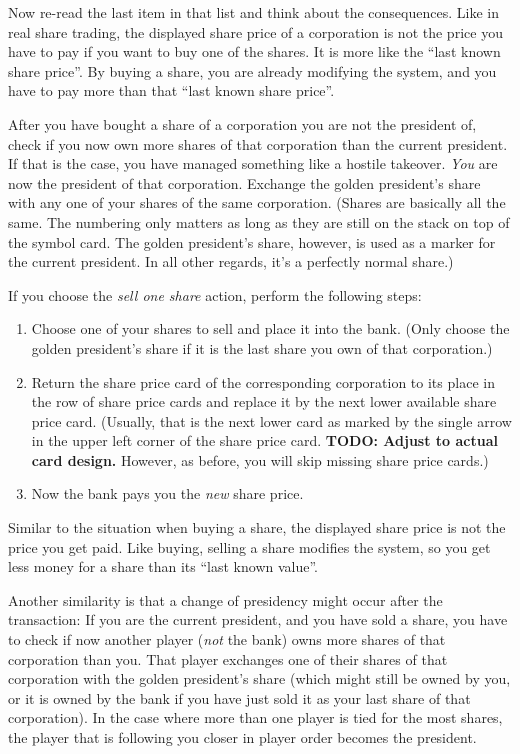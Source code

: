 \documentclass[10pt,final]{report}
\begin{document}
\begin{multicols}{2}
Now re-read the last item in that list and think about the
consequences. Like in real share trading, the displayed share price of
a corporation is not the price you have to pay if you want to buy one
of the shares. It is more like the ``last known share price''. By
buying a share, you are already modifying the system, and you have to
pay more than that ``last known share price''.

After you have bought a share of a corporation you are not the
president of, check if you now own more shares of that corporation
than the current president. If that is the case, you have managed
something like a hostile takeover. \emph{You} are now the president of
that corporation. Exchange the golden president's share with any one
of your shares of the same corporation. (Shares are basically
all the same. The numbering only matters as long as they are
still on the stack on top of the symbol card. The golden president's
share, however, is used as a marker for the current
president. In all other regards, it's a perfectly normal share.)

If you choose the \emph{sell one share} action, perform the following
steps:
\begin{enumerate}
\item Choose one of your shares to sell and place it into the
  bank. (Only choose the golden president's share if it is the last
  share you own of that corporation.)
\item Return the share price card of the corresponding corporation to
  its place in the row of share price cards and replace it by the next
  lower available share price card. (Usually, that is the next lower
  card as marked by the single arrow in the upper left corner of the
  share price card. \textbf{TODO: Adjust to actual card design.}
  However, as before, you will skip missing share price cards.)
\item Now the bank pays you the \emph{new} share price.
\end{enumerate}

Similar to the situation when buying a share, the displayed share
price is not the price you get paid. Like buying, selling a share
modifies the system, so you get less money for a share than its ``last
known value''.

Another similarity is that a change of presidency might occur after
the transaction: If you are the current president, and you have sold a
share, you have to check if now another player (\emph{not} the bank)
owns more shares of that corporation than you. That player exchanges
one of their shares of that corporation with the golden president's
share (which might still be owned by you, or it is owned by the bank
if you have just sold it as your last share of that corporation). In
the case where more than one player is tied for the most shares, the
player that is following you closer in player order becomes the
president.


\end{multicols}
\end{document}

